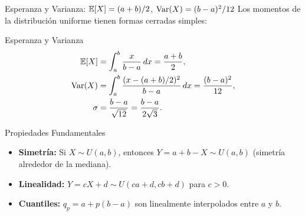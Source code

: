 \documentclass[10pt, aspectratio=169]{beamer}
\begin{document}
\begin{frame}{Esperanza y Varianza: $\mathbb{E}[X] = (a+b)/2$, $\operatorname{Var}(X) = (b-a)^{2}/12$}
  \footnotesize
  Los momentos de la distribución uniforme tienen formas cerradas simples: \pause

  \vspace{0.1cm}
  \begin{block}{Esperanza y Varianza}
    \begin{align*}
      \mathbb{E}[X] &= \int_{a}^{b} \frac{x}{b-a}\,dx = \frac{a + b}{2}, \\
      \operatorname{Var}(X) &= \int_{a}^{b} \frac{(x - (a+b)/2)^{2}}{b-a}\,dx = \frac{(b-a)^{2}}{12}, \\
      \sigma &= \frac{b-a}{\sqrt{12}} = \frac{b-a}{2\sqrt{3}}.
    \end{align*}
  \end{block}

  \vspace{0.1cm}
  \pause
  \begin{alertblock}{Propiedades Fundamentales}
    \begin{itemize}\itemsep=0.05cm
      \item \textbf{Simetría:} Si $X \sim U(a, b)$, entonces $Y = a + b - X \sim U(a, b)$ (simetría alrededor de la mediana).
      \item \textbf{Linealidad:} $Y = cX + d \sim U(ca+d, cb+d)$ para $c > 0$.
      \item \textbf{Cuantiles:} $q_{p} = a + p(b-a)$ son linealmente interpolados entre $a$ y $b$.
    \end{itemize}
  \end{alertblock}
\end{frame}
\end{document}
